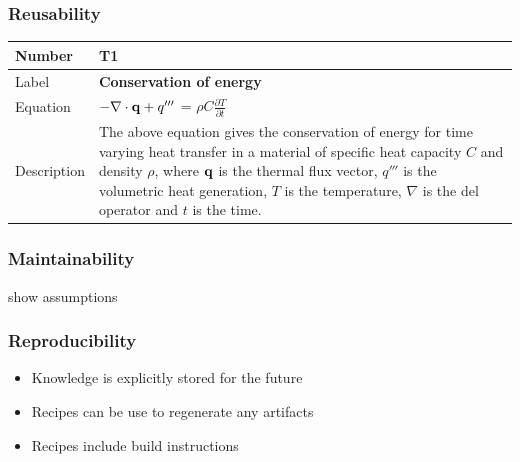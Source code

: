 \documentclass{beamer}
\newcommand{\colAwidth}{0.2\textwidth}
\newcommand{\colBwidth}{0.73\textwidth}
\begin{document}

\begin{frame}

\frametitle{Reusability}

 \noindent
\begin{minipage}{\columnwidth}
\begin{tabular}{@{} p{\colAwidth}  p{\colBwidth}@{}}
\toprule
\textbf{Number}& \textbf{T1} \\
\midrule
Label&\bf Conservation of energy\\
\midrule
Equation&  $-{\bf \nabla \cdot q} +q'''$ = $\rho C \frac{\partial T}{\partial t}$ \smallskip\\
\midrule
Description & The above equation gives the conservation of energy for time 
varying heat transfer in a material of specific heat capacity $C$ and density $\rho$,
where $\bf q$ is the thermal flux vector, $q'''$ is the volumetric heat
generation, $T$ is the temperature, $\nabla$ is the del operator and $t$ is the time.\\
\bottomrule
\end{tabular}
\end{minipage}

\end{frame}


\begin{frame}

\frametitle{Maintainability}

show assumptions

\end{frame}


\begin{frame}

\frametitle{Reproducibility}

\begin{itemize}
\item Knowledge is explicitly stored for the future
\item Recipes can be use to regenerate any artifacts
\item Recipes include build instructions
\end{itemize}
\end{frame}


\end{document}
